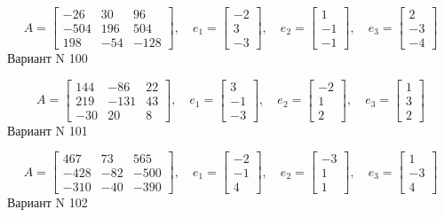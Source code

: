 \documentclass[11pt]{report}
\begin{document}
$$A = \left[\begin{matrix}-26 & 30 & 96\\-504 & 196 & 504\\198 & -54 & -128\end{matrix}\right],\quad e_1 = \left[\begin{matrix}-2\\3\\-3\end{matrix}\right],\quad e_2 = \left[\begin{matrix}1\\-1\\-1\end{matrix}\right],\quad e_3 = \left[\begin{matrix}2\\-3\\-4\end{matrix}\right]$$Вариант N 100

$$A = \left[\begin{matrix}144 & -86 & 22\\219 & -131 & 43\\-30 & 20 & 8\end{matrix}\right],\quad e_1 = \left[\begin{matrix}3\\-1\\-3\end{matrix}\right],\quad e_2 = \left[\begin{matrix}-2\\1\\2\end{matrix}\right],\quad e_3 = \left[\begin{matrix}1\\3\\2\end{matrix}\right]$$Вариант N 101

$$A = \left[\begin{matrix}467 & 73 & 565\\-428 & -82 & -500\\-310 & -40 & -390\end{matrix}\right],\quad e_1 = \left[\begin{matrix}-2\\-1\\4\end{matrix}\right],\quad e_2 = \left[\begin{matrix}-3\\1\\1\end{matrix}\right],\quad e_3 = \left[\begin{matrix}1\\-3\\4\end{matrix}\right]$$Вариант N 102
\end{document}
